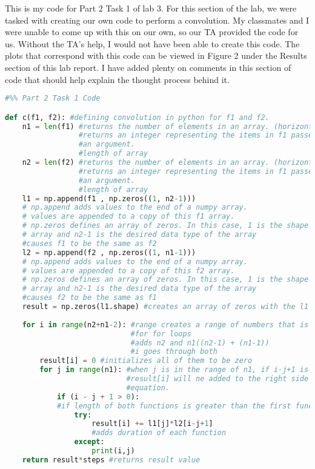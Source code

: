 \documentclass[12pt]{report}
\begin{document}
{This is my code for Part 2 Task 1 of lab 3. For this section of the lab, we were tasked with creating our own code to perform a convolution. My classmates and I were unable to come up with this on our own, so our TA provided the code for us. Without the TA's help, I would not have been able to create this code. The plots that correspond with this code can be viewed in Figure 2 under the Results section of this lab report. I have added plenty on comments in this section of code that should help explain the thought process behind it. }
\begin{lstlisting}[language=Python]
#%% Part 2 Task 1 Code

def c(f1, f2): #defining convolution in python for f1 and f2.
    n1 = len(f1) #returns the number of elements in an array. (horizontal)
                 #returns an integer representing the items in f1 passed as
                 #an argument.
                 #length of array
    n2 = len(f2) #returns the number of elements in an array. (horizontal)
                 #returns an integer representing the items in f1 passed as
                 #an argument.
                 #length of array
    l1 = np.append(f1 , np.zeros((1, n2-1)))
    # np.append adds values to the end of a numpy array.
    # values are appended to a copy of this f1 array.
    # np.zeros defines an array of zeros. In this case, 1 is the shape of the
    # array and n2-1 is the desired data type of the array
    #causes f1 to be the same as f2
    l2 = np.append(f2 , np.zeros((1, n1-1)))
    # np.append adds values to the end of a numpy array.
    # values are appended to a copy of this f2 array.
    # np.zeros defines an array of zeros. In this case, 1 is the shape of the
    # array and n2-1 is the desired data type of the array
    #causes f2 to be the same as f1
    result = np.zeros(l1.shape) #creates an array of zeros with the l1 shape
    
    for i in range(n2+n1-2): #range creates a range of numbers that is nice
                             #for for loops
                             #adds n2 and n1((n2-1) + (n1-1))
                             #i goes through both
        result[i] = 0 #initializes all of them to be zero
        for j in range(n1): #when j is in the range of n1, if i-j+1 is > 0
                            #result[i] will ne added to the right side of the 
                            #equation.
            if (i - j + 1 > 0): 
            #if length of both functions is greater than the first function
                try:
                    result[i] += l1[j]*l2[i-j+1] 
                    #adds duration of each function
                except:
                    print(i,j)
    return result*steps #returns result value




\end{lstlisting}
\end{document}
